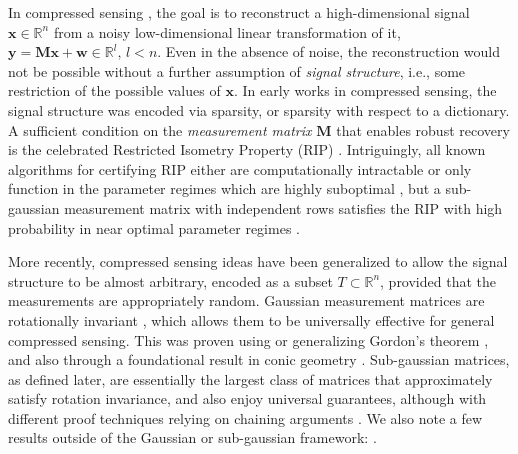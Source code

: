 \documentclass{article}
\def \R {\mathbb{R}}
\begin{document}
\par
In compressed sensing \cite{foucart2013mathematical}, the goal is to reconstruct a high-dimensional signal $\mathbf{x} \in \mathbb{R}^n$ from a noisy low-dimensional linear transformation of it, $\mathbf{y} = \mathbf{M}\mathbf{x} + \mathbf{w} \in \mathbb{R}^l,\, l < n$. Even in the absence of noise, the reconstruction would not be possible without a further assumption of \textit{signal structure}, i.e., some restriction of the possible values of $\mathbf{x}$.  In early works in compressed sensing, the signal structure was encoded via sparsity, or sparsity with respect to a dictionary. A sufficient condition on the \textit{measurement matrix} $\mathbf{M}$ that enables robust recovery is the celebrated Restricted Isometry Property (RIP) \cite{candes2008restricted}. Intriguingly, all known algorithms for certifying RIP either are computationally intractable or only function in the parameter regimes which are highly suboptimal \cite{ding2020average}, but a sub-gaussian measurement matrix with independent rows satisfies the RIP with high probability in near optimal parameter regimes \cite{baraniuk2008simple}.

More recently, compressed sensing ideas have been generalized to allow the signal structure to be almost arbitrary, encoded as a subset $T \subset \R^n$, provided that the measurements are appropriately random.  Gaussian measurement matrices are rotationally invariant \cite{vershynin}, which allows them to be universally effective for general compressed sensing.  This was proven using \cite{chandrasekaran2012convex, rudelson2008sparse} or generalizing \cite{stojnic2013framework, oymak2013squared, thrampoulidis2014simple} Gordon's theorem \cite{gordon1988milman}, and also through a foundational result in conic geometry \cite{amelunxen2014living}. Sub-gaussian matrices, as defined later, are essentially the largest class of matrices that approximately satisfy rotation invariance, and also enjoy universal guarantees, although with different proof techniques relying on chaining arguments \cite{mendelson2007reconstruction, liaw2017simple, jeong2020subgaussian}.  We also note a few results outside of the Gaussian or sub-gaussian framework: \cite{tropp2015convex,oymak2018universality, mendelson2014learning, mendelson2010empirical}.  
\end{document}

